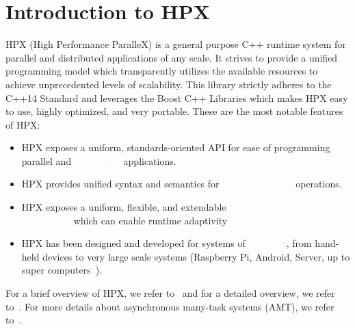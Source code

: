 \chapter{Introduction to HPX}
HPX (High Performance ParalleX) is a general purpose C++ runtime system for parallel and distributed applications of any scale. It strives to provide a unified programming model which transparently utilizes the available resources to achieve unprecedented levels of scalability.  This library strictly adheres to the C++14 Standard and leverages the Boost C++ Libraries which makes HPX easy to use, highly optimized, and very portable. These are the most notable features of HPX:
\vspace{0.25cm}
\begin{itemize}
\item HPX exposes a uniform, standards-oriented API for ease of programming parallel and \textcolor{azure}{distributed} applications.
\item HPX provides unified syntax and semantics for \textcolor{azure}{local and remote} operations.
\item HPX exposes a uniform, flexible, and extendable \textcolor{azure}{performance counter framework}~\cite{grubel2016dynamic,grubel2016using} which can enable runtime adaptivity
\item HPX has been designed and developed for systems of \textcolor{azure}{any scale}, from hand-held devices to very large scale systems (Raspberry Pi, Android, Server, up to super computers~\cite{daiss2019piz,heller2019harnessing}).
\end{itemize}
\vspace{0.25cm}
For a brief overview of HPX, we refer to~\cite{heller2017hpx,Kaiser2020} and for a detailed overview, we refer to~\cite{heller2019extending}. For more details about asynchronous many-task systems (AMT), we refer to~\cite{thoman2018taxonomy}.

